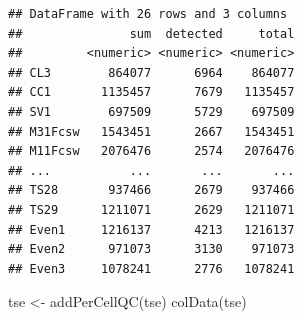 \documentclass[
]{book}
\newenvironment{Shaded}{\begin{snugshade}}{\end{snugshade}}
\newcommand{\FunctionTok}[1]{\textcolor[rgb]{0.00,0.00,0.00}{#1}}
\newcommand{\NormalTok}[1]{#1}
\newcommand{\OtherTok}[1]{\textcolor[rgb]{0.56,0.35,0.01}{#1}}
\begin{document}
\begin{verbatim}
## DataFrame with 26 rows and 3 columns
##               sum  detected     total
##         <numeric> <numeric> <numeric>
## CL3        864077      6964    864077
## CC1       1135457      7679   1135457
## SV1        697509      5729    697509
## M31Fcsw   1543451      2667   1543451
## M11Fcsw   2076476      2574   2076476
## ...           ...       ...       ...
## TS28       937466      2679    937466
## TS29      1211071      2629   1211071
## Even1     1216137      4213   1216137
## Even2      971073      3130    971073
## Even3     1078241      2776   1078241
\end{verbatim}

\begin{Shaded}
\begin{Highlighting}[]
\NormalTok{tse }\OtherTok{\textless{}{-}} \FunctionTok{addPerCellQC}\NormalTok{(tse)}
\FunctionTok{colData}\NormalTok{(tse)}
\end{Highlighting}
\end{Shaded}
\end{document}
